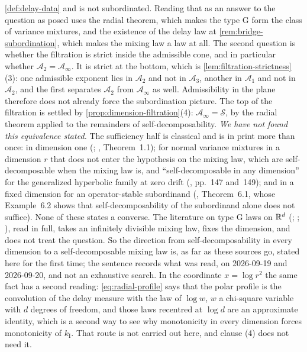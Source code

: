 \begin{remark}
\ref{def:delay-data} and is not subordinated. Reading that as an answer to the question as
posed uses the radial theorem, which makes the type G form the class of variance mixtures, and
the existence of the delay law at \ref{rem:bridge-subordination}, which makes the mixing law a
law at all. The second question is whether the filtration is strict inside the admissible cone,
and in particular whether $\mathcal{A}_2 = \mathcal{A}_\infty$. It is strict at the bottom, which
is \ref{lem:filtration-strictness}(3): one admissible exponent lies in $\mathcal{A}_2$ and not in
$\mathcal{A}_3$, another in $\mathcal{A}_1$ and not in $\mathcal{A}_2$, and the first separates
$\mathcal{A}_2$ from $\mathcal{A}_\infty$ as well. Admissibility in the
plane therefore does not already force the subordination picture. The top of the filtration is settled by \ref{prop:dimension-filtration}(4):
$\mathcal{A}_\infty = \mathcal{S}$, by the radial theorem applied to the remainders of
self-decomposability.
\emph{We have not found this equivalence stated.} The sufficiency half is classical and is in
print more than once: in dimension one (; ,
Theorem~1.1); for normal variance mixtures in a dimension $r$ that does not enter the hypothesis
on the mixing law, which are self-decomposable when the mixing law is, and ``self-decomposable in
any dimension'' for the generalized hyperbolic family at zero drift
(, pp.~147 and~149); and in a fixed dimension for an
operator-stable subordinand (, Theorem~6.1, whose
Example~6.2 shows that self-decomposability of the subordinand alone does not suffice). None of
these states a converse. The literature on type G laws on $\mathbb{R}^d$
(; ;
), read in full, takes an infinitely divisible mixing law, fixes the
dimension, and does not treat the question. So the direction from self-decomposability in every
dimension to a self-decomposable mixing law is, as far as these sources go, stated here for the
first time; the sentence records what was read, on 2026-09-19 and 2026-09-20, and not an
exhaustive search. In the coordinate $x = \log r^2$ the same fact has a second reading:
\ref{eq:radial-profile} says that the polar profile is the convolution of the delay measure with
the law of $\log w$, $w$ a chi-square variable with $d$ degrees of freedom, and those laws
recentred at $\log d$ are an approximate identity, which is a second way to see why monotonicity in every dimension forces monotonicity of $k_{\mathrm I}$. That route is not carried out here, and clause (4) does not need it.


\end{remark}

